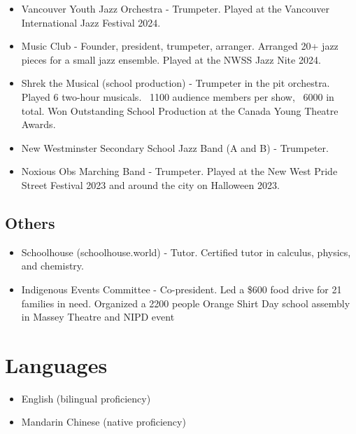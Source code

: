 \documentclass{article}
\begin{document}
\begin{itemize}
	\item Vancouver Youth Jazz Orchestra - Trumpeter. Played at the Vancouver International Jazz Festival 2024.
	\item Music Club - Founder, president, trumpeter, arranger. Arranged 20+ jazz pieces for a small jazz ensemble. Played at the NWSS Jazz Nite 2024.
	\item Shrek the Musical (school production) - Trumpeter in the pit orchestra. Played 6 two-hour musicals. ~1100 audience members per show, ~6000 in total. Won Outstanding School Production at the Canada Young Theatre Awards.
	\item New Westminster Secondary School Jazz Band (A and B) - Trumpeter.
	\item Noxious Obs Marching Band - Trumpeter. Played at the New West Pride Street Festival 2023 and around the city on Halloween 2023.
\end{itemize}

\subsection*{Others}
\begin{itemize}
	\item Schoolhouse (schoolhouse.world) - Tutor. Certified tutor in calculus, physics, and chemistry.
	\item Indigenous Events Committee - Co-president. Led a \$600 food drive for 21 families in need. Organized a 2200 people Orange Shirt Day school assembly in Massey Theatre and NIPD event
\end{itemize}

\section*{Languages}

\begin{itemize}
	\item English (bilingual proficiency)
	\item Mandarin Chinese (native proficiency)
\end{itemize}
\end{document}
